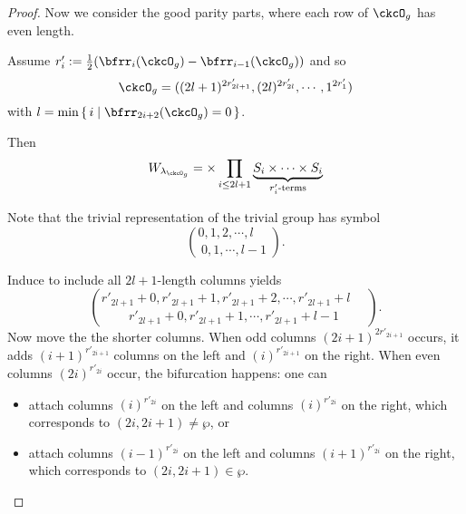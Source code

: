 \documentclass[12pt,a4paper]{amsart}
\DeclareMathOperator{\ind}{ind}
\newcommand{\sgn}{\operatorname{sgn}}
\numberwithin{equation}{section}
\theoremstyle{remark}
\def\half{{\tfrac{1}{2}}}
\def\lamckb{\lambda_{\ckcO_b}}
\def\lamckg{\lambda_{\ckcO_g}}
\def\sP{\wp}
\begin{document}
\begin{proof}
{%


 Now we consider the good parity parts, where each row of $\ckcO_{g}$ has even
 length.

 Assume $r'_{i} := \half(\bfrr_{i}(\ckcO_{g})-\bfrr_{i-1}(\ckcO_{g}))$
 and so
  \[
    \ckcO_{g} %
    = ((2l+1)^{2r'_{2l+1}}, (2l)^{2r'_{2l}},\cdots, 1^{2r'_{1}})
  \]
with $l =\min\set{i|\bfrr_{2i+2}(\ckcO_{g}) = 0}$.

Then
  \[
    W_{\lamckg} =
    \times \prod_{i\leq 2l+1}
    \underbrace{S_{i}\times \cdots\times S_{i}}_{r'_{i}\text{-terms}}
  \]

Note that the trivial representation of the trivial group has symbol
\[
\binom{0,1, 2, \cdots, l\phantom{-1}}{0,1, \cdots, l-1}.
\]


  Induce to include all $2l+1$-length columns yields
  \[
    \binom{r'_{2l+1}+0,r'_{2l+1}+1,r'_{2l+1}+2,\cdots, r'_{2l+1}+l\phantom{-1}}{
      r'_{2l+1}+0,r'_{2l+1}+1, \cdots, r'_{2l+1}+l-1}.
  \]
  Now move the the shorter columns. When odd columns
  $(2i+1)^{2r'_{2i+1}}$ occurs, it adds $(i+1)^{r'_{2i+1}}$ columns on the left
  and $(i)^{r'_{2i+1}}$ on the right.
  When even columns $(2i)^{r'_{2i}}$ occur,  the bifurcation
  happens: one can
  \begin{itemize}
    \item attach columns $(i)^{r'_{2i}}$ on the left and
    columns $(i)^{r'_{2i}}$ on the right, which corresponds to
    $(2i,2i+1)\neq \sP$, or
    \item
    attach columns $(i-1)^{r'_{2i}}$ on the left and
    columns $(i+1)^{r'_{2i}}$ on the right, which corresponds to
    $(2i,2i+1)\in \sP$.
  \end{itemize}


}
\end{proof}
\end{document}
